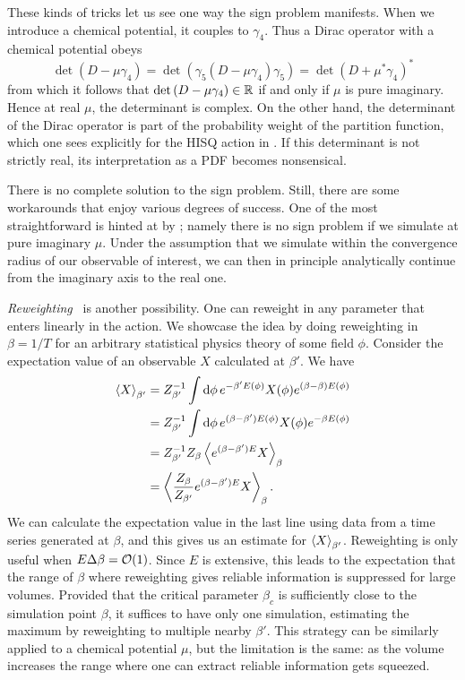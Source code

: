 These kinds of tricks let us see one way the sign problem manifests.
When we introduce a chemical potential, it couples to $\gamma_4$.
Thus a Dirac operator with a chemical potential obeys
\begin{equation}\label{eq:signproblem}
\det\left(D-\mu\gamma_4\right)
=\det\left(\gamma_5\left(D-\mu\gamma_4\right)\gamma_5\right)
=\det\left(D+\mu^*\gamma_4\right)^*
\end{equation}
from which it follows that
$\det\left(D-\mu\gamma_4\right)\in\mathbb{R}$ if and only if $\mu$
is pure imaginary. Hence at real $\mu$, the determinant
is complex. On the other hand, the determinant of the
Dirac operator is part of the probability weight
of the partition function, which one sees explicitly for
the HISQ action in . If this
determinant is not strictly real, its interpretation
as a PDF becomes nonsensical.

There is no complete solution to the sign problem. Still, there are
some workarounds that enjoy various degrees of success.
One of the most straightforward is hinted at by
; namely there is no sign problem
if we simulate at pure imaginary $\mu$. Under the assumption
that we simulate within the convergence radius of our
observable of interest, we can then in principle analytically
continue from the imaginary axis to the real one.

{\it Reweighting}~\cite{ferrenberg_new_1989}
is another possibility. One can reweight in any parameter that
enters linearly in the action. 
We showcase the idea by doing reweighting in $\beta=1/T$ for
an arbitrary statistical physics theory of some field $\phi$. Consider
the expectation value of an observable $X$ calculated at $\beta'$. We have
\begin{equation}\label{eq:RW}
\begin{aligned}
  \ev{X}_{\beta'}&=Z_{\beta'}^{-1}\int\dd{\phi}e^{-\beta'E(\phi)}X(\phi)
                  e^{(\beta-\beta)E(\phi)}\\
                 &=Z_{\beta'}^{-1}\int\dd{\phi}e^{(\beta-\beta')E(\phi)}
                  X(\phi)e^{-\beta E(\phi)}\\
                 &=Z_{\beta'}^{-1}Z_{\beta}\ev{e^{(\beta-\beta')E}X}_\beta\\
                 &=\ev{\frac{Z_\beta}{Z_{\beta'}}e^{(\beta-\beta')E}X}_\beta.
\end{aligned}
\end{equation}
We can calculate the expectation value in the last line
using data from a time series generated at $\beta$, and this gives us an
estimate for $\ev{X}_{\beta'}$. Reweighting is only useful when
$E\Delta\beta=\order{1}$. Since $E$ is extensive, this leads to the
expectation that the range of $\beta$ where reweighting gives reliable
information is suppressed for large volumes. 
Provided that the critical parameter $\beta_c$
is sufficiently close to the simulation point $\beta$, it suffices
to have only one simulation, estimating the maximum by reweighting to
multiple nearby $\beta'$. This strategy can be similarly applied
to a chemical potential $\mu$, but the limitation is the same: as
the volume increases the range where one can extract reliable
information gets squeezed.

